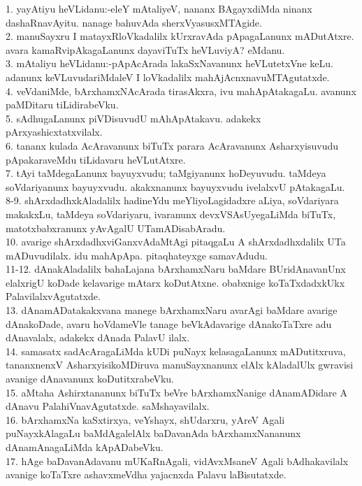\documentclass{article}
\begin{document}
1. yayAtiyu heVLidanu:-eleY mAtaliyeV, nananx BAgayxdiMda ninanx dashaRnavAyitu. nanage bahuvAda sherxVyasusxMTAgide.\\
2. manuSayxru I matayxRloVkadalilx kUrxravAda pApagaLanunx mADutAtxre. avara kamaRvipAkagaLanunx dayaviTuTx heVLuviyA? eMdanu.\\
3. mAtaliyu heVLidanu:-pApAcArada lakaSxNavanunx heVLutetxVne keLu. adanunx keVLuvudariMdaleV I loVkadalilx mahAjAcnxnavuMTAgutatxde.\\
4. veVdaniMde, bArxhamxNAcArada tirasAkxra, ivu mahApAtakagaLu. avanunx paMDitaru tiLidirabeVku.\\
5. sAdhugaLanunx piVDisuvudU mAhApAtakavu. adakekx pArxyashicxtatxvilalx.\\
6. tananx kulada AcAravanunx biTuTx parara AcAravanunx Asharxyisuvudu pApakaraveMdu tiLidavaru heVLutAtxre.\\
7. tAyi taMdegaLanunx bayuyxvudu; taMgiyanunx hoDeyuvudu. taMdeya soVdariyanunx bayuyxvudu. akakxnanunx bayuyxvudu ivelalxvU pAtakagaLu.\\
8-9. shArxdadhxkAladalilx hadineYdu meYliyoLagidadxre aLiya, soVdariyara makakxLu, taMdeya soVdariyaru, ivaranunx devxVSAsUyegaLiMda biTuTx, matotxbabxranunx yAvAgalU UTamADisabAradu.\\
10. avarige shArxdadhxviGanxvAdaMtAgi pitaqgaLu A shArxdadhxdalilx UTa mADuvudilalx. idu mahApApa. pitaqhateyxge samavAdudu.\\
11-12. dAnakAladalilx bahaLajana bArxhamxNaru baMdare BUridAnavanUnx elalxrigU koDade kelavarige mAtarx koDutAtxne. obabxnige koTaTxdadxkUkx PalavilalxvAgutatxde.\\
13. dAnamADatakakxvana manege bArxhamxNaru avarAgi baMdare avarige dAnakoDade, avaru hoVdameVle tanage beVkAdavarige dAnakoTaTxre adu dAnavalalx, adakekx dAnada PalavU ilalx.\\
14. samasatx sadAcAragaLiMda kUDi puNayx kelasagaLanunx mADutitxruva, tananxnenxV AsharxyisikoMDiruva manuSayxnanunx elAlx kAladalUlx gwravisi avanige dAnavanunx koDutitxrabeVku.\\
15. aMtaha Ashirxtananunx biTuTx beVre bArxhamxNanige dAnamADidare A dAnavu PalahiVnavAgutatxde. saMshayavilalx.\\
16. bArxhamxNa kaSxtirxya, veYshayx, shUdarxru, yAreV Agali puNayxkAlagaLu baMdAgalelAlx baDavanAda bArxhamxNananunx dAnamAnagaLiMda kApADabeVku.\\
17. hAge baDavanAdavanu mUKaRnAgali, vidAvxMsaneV Agali bAdhakavilalx avanige koTaTxre ashavxmeVdha yajacnxda Palavu laBisutatxde.\\
\end{document}

